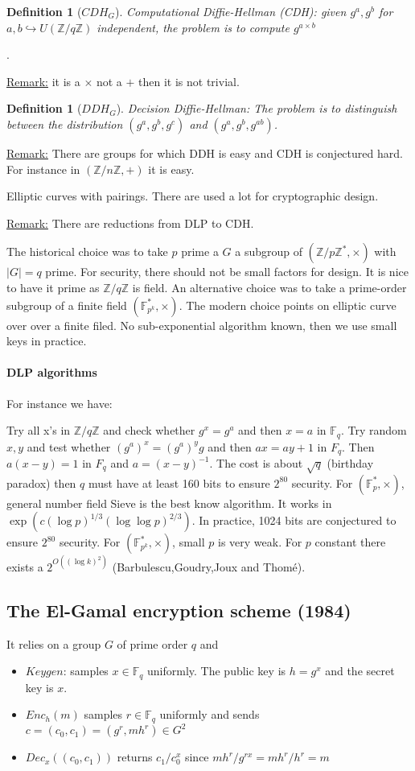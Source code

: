 \documentclass{article}
\newtheorem{defi}[thm]{Definition}
\newcommand{\Def}[3]{\begin{defi}[#1]\label{#2}#3\end{defi}}
\newcommand{\Rem}{\underline{Remark:} }
\newcommand{\Z}{\mathbb{Z}}
\newcommand{\F}{\mathbb{F}}
\begin{document}
\Def{$CDH_G$}{def:CDH}{Computational Diffie-Hellman (CDH): given $g^a,g^b$ for $a,b\hookrightarrow U(\Z/q\Z)$ independent, the problem is to compute $g^{a\times b}$}.

\Rem it is a $\times$ not a $+$ then it is not trivial.

\Def{$DDH_G$}{def:DDH}{Decision Diffie-Hellman: The problem is to distinguish between the distribution $(g^a,g^b,g^c)$ and $(g^a,g^b,g^{ab})$.}

\Rem There are groups for which DDH is easy and CDH is conjectured hard. For instance in $(\Z/n\Z,+)$ it is easy.

Elliptic curves with pairings. There are used a lot for cryptographic design.

\Rem There are reductions from DLP to CDH.

The historical choice was to take $p$ prime a $G$ a subgroup of $(\Z/p\Z^*,\times)$ with $|G|=q$ prime. For security, there should not be small factors for design. It is nice to have it prime as $\Z/q\Z$ is field. An alternative choice was to take a prime-order subgroup of a finite field $(\F_{p^k}^*,\times)$. The modern choice points on elliptic curve over over a finite filed. No sub-exponential algorithm known, then we use small keys in practice.

\paragraph{DLP algorithms} For instance we have:

\subitem Try all x's in $\Z/q\Z$ and check whether $g^x = g^a$ and then $x=a$ in $\F_q$.
\subitem Try random $x,y$ and test whether $(g^a)^x=(g^a)^yg$ and then $ax=ay+1$ in $F_q$. Then $a(x-y)=1$ in $F_q$ and $a=(x-y)^{-1}$. The cost is about $\sqrt{q}$ (birthday paradox) then $q$ must have at least 160 bits to ensure $2^{80}$ security.
\subitem For $(\F_p^*,\times)$, general number field Sieve is the best know algorithm. It works in $\exp(c(\log p)^{1/3}(\log\log p)^{2/3})$. In practice, 1024 bits are conjectured to ensure $2^80$ security.
\subitem For $(\F_{p^k}^*,\times)$, small $p$ is very weak. For $p$ constant there exists a $2^{O((\log k)^2)}$ (Barbulescu,Goudry,Joux and Thomé).

\subsection{The El-Gamal encryption scheme (1984)}
It relies on a group $G$ of prime order $q$ and \begin{itemize}
\item $Keygen$: samples $x\in \F_q$ uniformly. The public key is $h=g^x$ and the secret key is $x$.
\item $Enc_h(m)$ samples $r\in\F_q$ uniformly and sends $c=(c_0,c_1)=(g^r,mh^r)\in G^2$
\item $Dec_x((c_0,c_1))$ returns $c_1/c_0^x$ since $mh^r/g^{rx}=mh^r/h^r=m$
\end{itemize}
\end{document}
